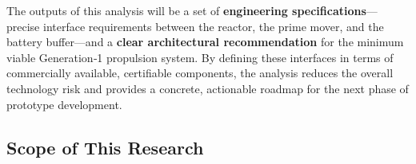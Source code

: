 \documentclass[12pt]{article}
\begin{document}
The outputs of this analysis will be a set of \textbf{engineering specifications}---precise interface requirements between the reactor, the prime mover, and the battery buffer---and a \textbf{clear architectural recommendation} for the minimum viable Generation‑1 propulsion system. By defining these interfaces in terms of commercially available, certifiable components, the analysis reduces the overall technology risk and provides a concrete, actionable roadmap for the next phase of prototype development.

\break

\subsection{Scope of This Research}
\label{sec:scope-questions}

\setlength{\tabcolsep}{4pt}
\small
\end{document}
